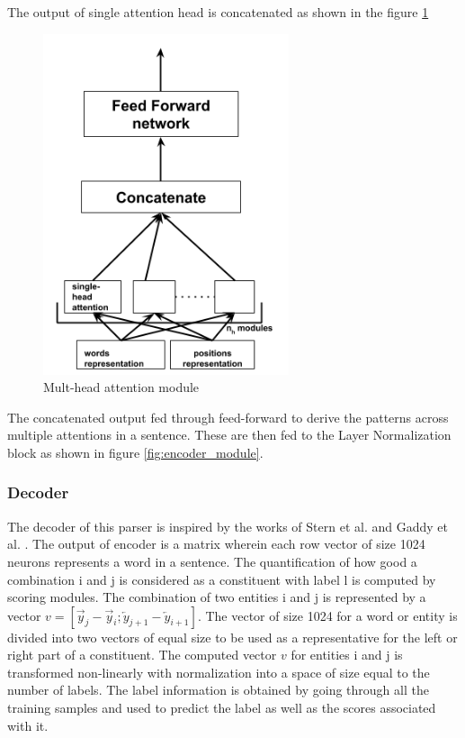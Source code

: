 \documentclass[a4paper, 11pt]{article}
\begin{document}
The output of single attention head is concatenated as shown in the figure \ref{fig:multi_head_attention_module}
\begin{figure}[htpb]
    \centering
    \includegraphics[width=\textwidth,height=10cm,keepaspectratio=true]
    {multi-head-attention.png}
    \caption{
        Mult-head attention module
    }
    \label{fig:multi_head_attention_module}
\end{figure}

The concatenated output fed through feed-forward to derive the patterns across multiple attentions in a sentence. These are then fed to the Layer Normalization block as shown in figure \ref{fig:encoder_module}.

\subsubsection{Decoder}
The decoder of this parser is inspired by the works of Stern et al. \parencite{Stern2017} and Gaddy et al. \parencite{Gaddy2018}. The output of encoder is a matrix wherein each row vector of size 1024 neurons represents a word in a sentence. The quantification of how good a combination i and j is considered as a constituent with label l is computed by scoring modules. The combination of two entities i and j is represented by a vector  $v = [\overrightarrow{y}_j - \overrightarrow{y}_i; \overleftarrow{y}_{j+1} - \overleftarrow{y}_{i+1}]$. The vector of size 1024 for a word or entity is divided into two vectors of equal size to be used as a representative for the left or right part of a constituent. The computed vector $v$ for entities i and j  is transformed non-linearly with normalization into a space of size equal to the number of labels. The label information is obtained by going through all the training samples and used to predict the label as well as the scores associated with it. 
\end{document}
